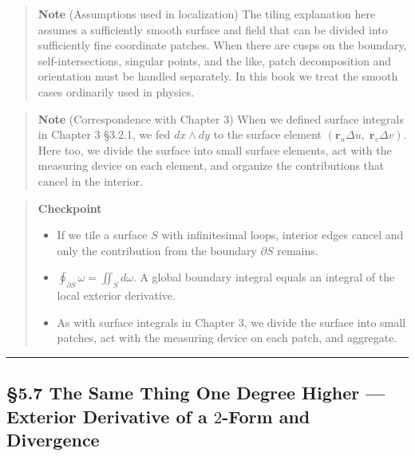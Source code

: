 \begin{quote}
\textbf{Note} (Assumptions used in localization) The tiling explanation
here assumes a sufficiently smooth surface and field that can be divided
into sufficiently fine coordinate patches. When there are cusps on the
boundary, self-intersections, singular points, and the like, patch
decomposition and orientation must be handled separately. In this book
we treat the smooth cases ordinarily used in physics.
\end{quote}

\begin{quote}
\textbf{Note} (Correspondence with Chapter 3) When we defined surface
integrals in Chapter 3 §3.2.1, we fed \(dx \wedge dy\) to the surface
element \((\mathbf{r}_u\Delta u,\;\mathbf{r}_v\Delta v)\). Here too, we
divide the surface into small surface elements, act with the measuring
device on each element, and organize the contributions that cancel in
the interior.
\end{quote}

\begin{quote}
\textbf{Checkpoint}

\begin{itemize}
\item
  If we tile a surface \(S\) with infinitesimal loops, interior edges
  cancel and only the contribution from the boundary \(\partial S\)
  remains.
\item
  \(\oint_{\partial S} \omega = \iint_S d\omega\). A global boundary
  integral equals an integral of the local exterior derivative.
\item
  As with surface integrals in Chapter 3, we divide the surface into
  small patches, act with the measuring device on each patch, and
  aggregate.
\end{itemize}
\end{quote}

\begin{center}\rule{0.5\linewidth}{0.5pt}\end{center}

\hypertarget{the-same-thing-one-degree-higher-exterior-derivative-of-a-2-form-and-divergence}{%
\subsection{\texorpdfstring{§5.7 The Same Thing One Degree Higher ---
Exterior Derivative of a \(2\)-Form and
Divergence}{§5.7 The Same Thing One Degree Higher --- Exterior Derivative of a 2-Form and Divergence}}\label{the-same-thing-one-degree-higher-exterior-derivative-of-a-2-form-and-divergence}}

